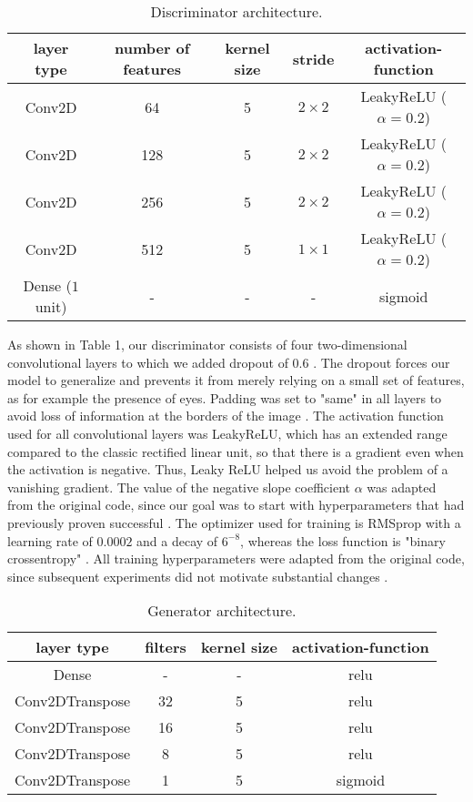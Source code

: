 \documentclass[11pt]{article}
\begin{document}
\begin{center}
\begin{table}[H]
\centering
\begin{tabular}{||c c c c c||}
\hline
layer type & number of features & kernel size & stride & activation-function \\ [0.5ex]
\hline\hline
Conv2D & 64 & 5 & $2 \times 2$ & LeakyReLU ($\alpha = 0.2$) \\
\hline
Conv2D & 128 & 5 & $2 \times 2$ & LeakyReLU ($\alpha = 0.2$) \\
\hline
Conv2D & 256 & 5 & $2 \times 2$ & LeakyReLU ($\alpha = 0.2$) \\
\hline
Conv2D & 512 & 5 & $1 \times 1$ & LeakyReLU ($\alpha = 0.2$) \\
\hline
Dense ($1$ unit) & - & - & - & sigmoid \\
\hline
\end{tabular}
\caption{\label{tab:Discriminator}Discriminator architecture.}
\end{table}
\end{center}

As shown in Table 1, our discriminator consists of four two-dimensional convolutional layers to which we added dropout of 0.6 \cite{gan}. The dropout forces our model to generalize and prevents it from merely relying on a small set of features, as for example the presence of eyes. Padding was set to "same" in all layers to avoid loss of information at the borders of the image \cite{gan}. The activation function used for all convolutional layers was LeakyReLU, which has an extended range compared to the classic rectified linear unit, so that there is a gradient even when the activation is negative. Thus, Leaky ReLU helped us avoid the problem of a vanishing gradient. The value of the negative slope coefficient $\alpha$ was adapted from the original code, since our goal was to start with hyperparameters that had previously proven successful \cite{gan}. The optimizer used for training is RMSprop with a learning rate of $0.0002$ and a decay of $6^{-8}$, whereas the loss function is "binary crossentropy" \cite{gan}. All training hyperparameters were adapted from the original code, since subsequent experiments did not motivate substantial changes \cite{gan}.

\begin{center}
\begin{table}[H]
\centering
\begin{tabular}{||c c c c||}
\hline
layer type & filters & kernel size & activation-function \\ [0.5ex]
\hline\hline
Dense & - & - & relu \\
\hline
Conv2DTranspose & 32 & 5 & relu \\
\hline
Conv2DTranspose & 16 & 5 & relu \\
\hline
Conv2DTranspose & 8 & 5 & relu \\
\hline
Conv2DTranspose & 1 & 5 & sigmoid \\
\hline
\end{tabular}
\caption{\label{tab:Generator}Generator architecture.}
\end{table}
\end{center}
\end{document}
